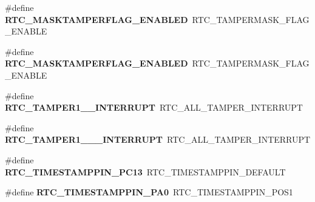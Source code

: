 \begin{DoxyCompactItemize}
\item 
\hypertarget{group___h_a_l___r_t_c___aliased___defines_gab9424e57ef6067b1d7f5030ee45192d5}{\#define {\bfseries R\-T\-C\-\_\-\-M\-A\-S\-K\-T\-A\-M\-P\-E\-R\-F\-L\-A\-G\-\_\-\-E\-N\-A\-B\-L\-E\-D}~R\-T\-C\-\_\-\-T\-A\-M\-P\-E\-R\-M\-A\-S\-K\-\_\-\-F\-L\-A\-G\-\_\-\-E\-N\-A\-B\-L\-E}\label{group___h_a_l___r_t_c___aliased___defines_gab9424e57ef6067b1d7f5030ee45192d5}

\item 
\hypertarget{group___h_a_l___r_t_c___aliased___defines_gab9424e57ef6067b1d7f5030ee45192d5}{\#define {\bfseries R\-T\-C\-\_\-\-M\-A\-S\-K\-T\-A\-M\-P\-E\-R\-F\-L\-A\-G\-\_\-\-E\-N\-A\-B\-L\-E\-D}~R\-T\-C\-\_\-\-T\-A\-M\-P\-E\-R\-M\-A\-S\-K\-\_\-\-F\-L\-A\-G\-\_\-\-E\-N\-A\-B\-L\-E}\label{group___h_a_l___r_t_c___aliased___defines_gab9424e57ef6067b1d7f5030ee45192d5}

\item 
\hypertarget{group___h_a_l___r_t_c___aliased___defines_gad52c576aeb40eeeed3274e6a8c5cf83a}{\#define {\bfseries R\-T\-C\-\_\-\-T\-A\-M\-P\-E\-R1\-\_\-\_\-\-I\-N\-T\-E\-R\-R\-U\-P\-T}~R\-T\-C\-\_\-\-A\-L\-L\-\_\-\-T\-A\-M\-P\-E\-R\-\_\-\-I\-N\-T\-E\-R\-R\-U\-P\-T}\label{group___h_a_l___r_t_c___aliased___defines_gad52c576aeb40eeeed3274e6a8c5cf83a}

\item 
\hypertarget{group___h_a_l___r_t_c___aliased___defines_ga30a97d2cbfeca6b663b9f116e13c511a}{\#define {\bfseries R\-T\-C\-\_\-\-T\-A\-M\-P\-E\-R1\-\_\-\_\-\_\-\-I\-N\-T\-E\-R\-R\-U\-P\-T}~R\-T\-C\-\_\-\-A\-L\-L\-\_\-\-T\-A\-M\-P\-E\-R\-\_\-\-I\-N\-T\-E\-R\-R\-U\-P\-T}\label{group___h_a_l___r_t_c___aliased___defines_ga30a97d2cbfeca6b663b9f116e13c511a}

\item 
\hypertarget{group___h_a_l___r_t_c___aliased___defines_ga86b6c9d9b06b1ab23722bf02799adfca}{\#define {\bfseries R\-T\-C\-\_\-\-T\-I\-M\-E\-S\-T\-A\-M\-P\-P\-I\-N\-\_\-\-P\-C13}~R\-T\-C\-\_\-\-T\-I\-M\-E\-S\-T\-A\-M\-P\-P\-I\-N\-\_\-\-D\-E\-F\-A\-U\-L\-T}\label{group___h_a_l___r_t_c___aliased___defines_ga86b6c9d9b06b1ab23722bf02799adfca}

\item 
\hypertarget{group___h_a_l___r_t_c___aliased___defines_ga8d806818f1fcdaf744042a19563a8052}{\#define {\bfseries R\-T\-C\-\_\-\-T\-I\-M\-E\-S\-T\-A\-M\-P\-P\-I\-N\-\_\-\-P\-A0}~R\-T\-C\-\_\-\-T\-I\-M\-E\-S\-T\-A\-M\-P\-P\-I\-N\-\_\-\-P\-O\-S1}\label{group___h_a_l___r_t_c___aliased___defines_ga8d806818f1fcdaf744042a19563a8052}


\end{DoxyCompactItemize}
